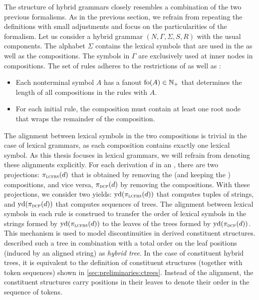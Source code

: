 \documentclass[../../document.tex]{subfiles}
\begin{document}
    The structure of hybrid grammars closely resembles a combination of the two previous formalisms.
    As in the previous section, we refrain from repeating the definitions with small adjustments and focus on the particularities of the formalism.
    Let us consider a hybrid grammar \((N, \varGamma, \varSigma, S, R)\) with the usual components.
    The alphabet \(\varSigma\) contains the lexical symbols that are used in the  as well as the  compositions.
    The symbols in \(\varGamma\) are exclusively used at inner nodes in  compositions.
    The set of rules adheres to the restrictions of  as well as :
    \begin{itemize}
        \item Each nonterminal symbol \(A\) has a fanout \(\operatorname{fo}(A) \in \mathbb{N}_+\) that determines the length of all  compositions in the rules with  \(A\).
        \item For each initial rule, the  composition must contain at least one root node that wraps the remainder of the composition.
    \end{itemize}
    The alignment between lexical symbols in the two compositions is trivial in the case of lexical grammars, as each composition contains exactly one lexical symbol.
    As this thesis focuses in lexical grammars, we will refrain from denoting these alignments explicitly.
    For each derivation \(d\) in an , there are two projections: \(\pi_{\textsc{lcfrs}}(d)\) that is obtained by removing the  (and keeping the ) compositions, and vice versa, \(\pi_{\textsc{dcp}}(d)\) by removing the  compositions.
    With these projections, we consider two yields: \(\operatorname{yd}(\pi_{\textsc{lcfrs}}(d))\) that computes tuples of strings, and \(\operatorname{yd}(\pi_{\textsc{dcp}}(d))\) that computes sequences of trees.
    The alignment between lexical symbols in each rule is construed to transfer the order of lexical symbols in the strings formed by \(\operatorname{yd}(\pi_{\textsc{lcfrs}}(d))\) to the leaves of the trees formed by \(\operatorname{yd}(\pi_{\textsc{dcp}}(d))\).
    This mechanism is used to model discontinuities in derived constituent structures.
     described such a tree in combination with a total order on the leaf positions (induced by an aligned string) as \emph{hybrid tree}.
    In the case of constituent hybrid trees, it is equivalent to the definition of constituent structures (together with token sequences) shown in \cref{sec:preliminaries:ctrees}.
    Instead of the alignment, the constituent structures carry positions in their leaves to denote their order in the sequence of tokens.
\end{document}
